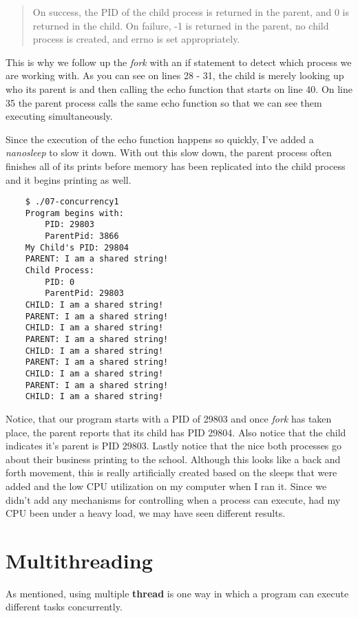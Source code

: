 \documentclass[../main.tex]{subfiles}
\begin{document}
	\begin{quotation}
		On success, the PID of the child process is returned in the parent, and 0 is returned in the child.  On failure, -1 is returned in the parent, no child process is created, and errno is set appropriately.
	\end{quotation}

	This is why we follow up the \textit{fork} with an if statement to detect which process we are working with.  As you can see on lines 28 - 31, the child is merely looking up who its parent is and then calling the echo function that starts on line 40.  On line 35 the parent process calls the same echo function so that we can see them executing simultaneously.  
	
	Since the execution of the echo function happens so quickly, I've added a \textit{nanosleep} to slow it down.  With out this slow down, the parent process often finishes all of its prints before memory has been replicated into the child process and it begins printing as well.
	
	\begin{verbatim}
	$ ./07-concurrency1 
	Program begins with:
		PID: 29803
		ParentPid: 3866
	My Child's PID: 29804
	PARENT: I am a shared string!
	Child Process:
		PID: 0
		ParentPid: 29803
	CHILD: I am a shared string!
	PARENT: I am a shared string!
	CHILD: I am a shared string!
	PARENT: I am a shared string!
	CHILD: I am a shared string!
	PARENT: I am a shared string!
	CHILD: I am a shared string!
	PARENT: I am a shared string!
	CHILD: I am a shared string!
	\end{verbatim}
	
	Notice, that our program starts with a PID of 29803 and once \textit{fork} has taken place, the parent reports that its child has PID 29804.  Also notice that the child indicates it's parent is PID 29803.  Lastly notice that the nice both processes go about their business printing to the school.  Although this looks like a back and forth movement, this is really artificially created based on the sleeps that were added and the low CPU utilization on my computer when I ran it.  Since we didn't add any mechanisms for controlling when a process can execute, had my CPU been under a heavy load, we may have seen different results.
	
	\section{Multithreading}
	
	As mentioned, using multiple \textbf{thread} is one way in which a program can execute different tasks concurrently.  
	
\end{document}
